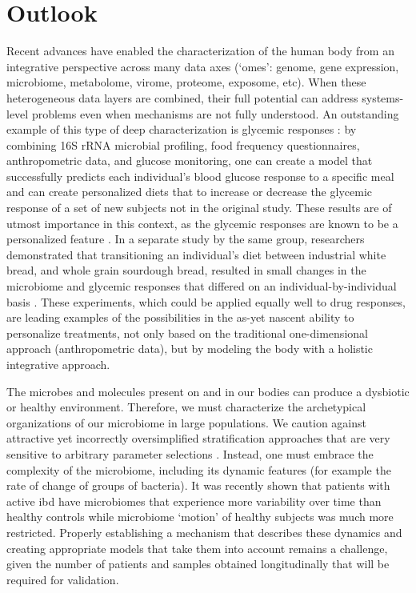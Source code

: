 \section{Outlook}
Recent advances have enabled the characterization of the human body from an integrative perspective across many data axes (`omes': genome, gene expression, microbiome, metabolome, virome, proteome, exposome, etc). When these heterogeneous data layers are combined, their full potential can address systems-level problems even when mechanisms are not fully understood. An outstanding example of this type of deep characterization is glycemic responses \cite{RN4181}:  by combining 16S rRNA microbial profiling, food frequency questionnaires, anthropometric data, and glucose monitoring, one can create a model that successfully predicts each individual’s blood glucose response to a specific meal and can create personalized diets that to increase or decrease the glycemic response of a set of new subjects not in the original study. These results are of utmost importance in this context, as the glycemic responses are known to be a personalized feature \cite{RN4192, RN4191}. In a separate study by the same group, researchers demonstrated that transitioning an individual's diet between industrial white bread, and whole grain sourdough bread, resulted in small changes in the microbiome and glycemic responses that differed on an individual-by-individual basis \cite{RN4193}. These experiments, which could be applied equally well to drug responses, are leading examples of the possibilities in the as-yet nascent ability to personalize treatments, not only based on the traditional one-dimensional approach (anthropometric data), but by modeling the body with a holistic integrative approach.

The microbes and molecules present on and in our bodies can produce a dysbiotic or healthy environment. Therefore, we must characterize the archetypical organizations of our microbiome in large populations. We caution against attractive yet incorrectly oversimplified stratification approaches \cite{RN4194} that are very sensitive to arbitrary parameter selections \cite{RN4195, RN4196}. Instead, one must embrace the complexity of the microbiome, including its dynamic features (for example the rate of change of groups of bacteria). It was recently shown that patients with active \gls{ibd} have microbiomes that experience more variability over time than healthy controls \cite{RN4197} while microbiome `motion' of healthy subjects was much more restricted. Properly establishing a mechanism that describes these dynamics and creating appropriate models that take them into account remains a challenge, given the number of patients and samples obtained longitudinally that will be required for validation.

